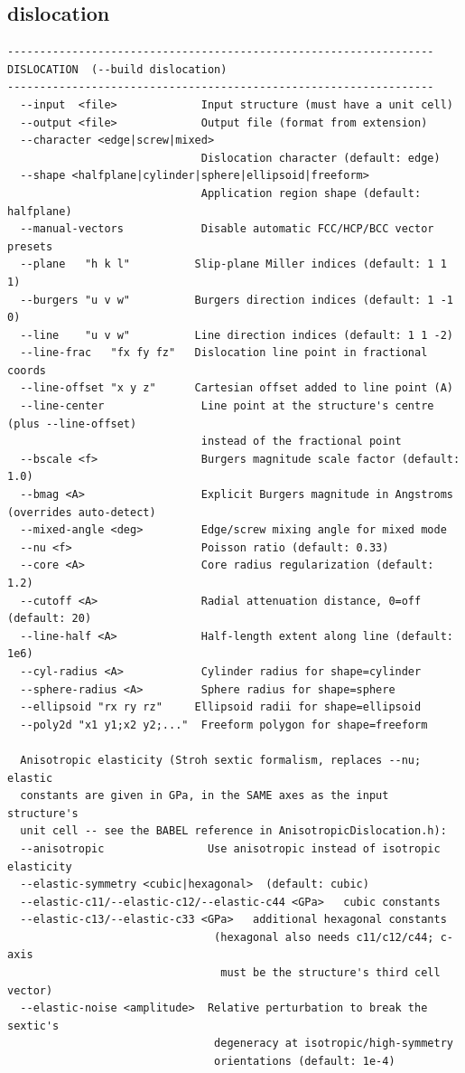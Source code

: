 \clearpage

\subsection{dislocation}

\begin{lstlisting}
------------------------------------------------------------------
DISLOCATION  (--build dislocation)
------------------------------------------------------------------
  --input  <file>             Input structure (must have a unit cell)
  --output <file>             Output file (format from extension)
  --character <edge|screw|mixed>
                              Dislocation character (default: edge)
  --shape <halfplane|cylinder|sphere|ellipsoid|freeform>
                              Application region shape (default: halfplane)
  --manual-vectors            Disable automatic FCC/HCP/BCC vector presets
  --plane   "h k l"          Slip-plane Miller indices (default: 1 1 1)
  --burgers "u v w"          Burgers direction indices (default: 1 -1 0)
  --line    "u v w"          Line direction indices (default: 1 1 -2)
  --line-frac   "fx fy fz"   Dislocation line point in fractional coords
  --line-offset "x y z"      Cartesian offset added to line point (A)
  --line-center               Line point at the structure's centre (plus --line-offset)
                              instead of the fractional point
  --bscale <f>                Burgers magnitude scale factor (default: 1.0)
  --bmag <A>                  Explicit Burgers magnitude in Angstroms (overrides auto-detect)
  --mixed-angle <deg>         Edge/screw mixing angle for mixed mode
  --nu <f>                    Poisson ratio (default: 0.33)
  --core <A>                  Core radius regularization (default: 1.2)
  --cutoff <A>                Radial attenuation distance, 0=off (default: 20)
  --line-half <A>             Half-length extent along line (default: 1e6)
  --cyl-radius <A>            Cylinder radius for shape=cylinder
  --sphere-radius <A>         Sphere radius for shape=sphere
  --ellipsoid "rx ry rz"     Ellipsoid radii for shape=ellipsoid
  --poly2d "x1 y1;x2 y2;..."  Freeform polygon for shape=freeform

  Anisotropic elasticity (Stroh sextic formalism, replaces --nu; elastic
  constants are given in GPa, in the SAME axes as the input structure's
  unit cell -- see the BABEL reference in AnisotropicDislocation.h):
  --anisotropic                Use anisotropic instead of isotropic elasticity
  --elastic-symmetry <cubic|hexagonal>  (default: cubic)
  --elastic-c11/--elastic-c12/--elastic-c44 <GPa>   cubic constants
  --elastic-c13/--elastic-c33 <GPa>   additional hexagonal constants
                                (hexagonal also needs c11/c12/c44; c-axis
                                 must be the structure's third cell vector)
  --elastic-noise <amplitude>  Relative perturbation to break the sextic's
                                degeneracy at isotropic/high-symmetry
                                orientations (default: 1e-4)


\end{lstlisting}
